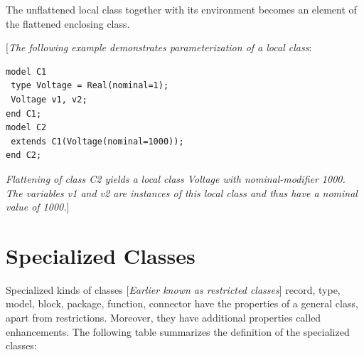 \documentclass[10pt,a4paper]{report}
\def\Mcomment#1{{[}\emph{#1}{]}}
\def\Mcommentbegin#1{{[}\emph{#1}}
\def\Mcommentend#1{\emph{#1}{]}}
\def\doublelabel#1{\label{#1}\hypertarget{#1}{}}
\begin{document}
The unflattened local class together with its environment becomes an
element of the flattened enclosing class.

\Mcommentbegin{The following example demonstrates parameterization of a local
class}:
\begin{lstlisting}[language=modelica]
model C1
 type Voltage = Real(nominal=1);
 Voltage v1, v2;
end C1;
model C2
 extends C1(Voltage(nominal=1000));
end C2;
\end{lstlisting}
\Mcommentend{Flattening of class \emph{C2} yields a local class Voltage with
nominal-modifier 1000. The variables \emph{v1} and \emph{v2} are
instances of this local class and thus have a nominal value of 1000.}

\section{Specialized Classes}\doublelabel{specialized-classes}

Specialized kinds of classes \Mcomment{Earlier known as restricted
classes} record, type, model, block, package, function, connector
have the properties of a general class, apart from restrictions.
Moreover, they have additional properties called enhancements. The
following table summarizes the definition of the specialized classes:
\end{document}

